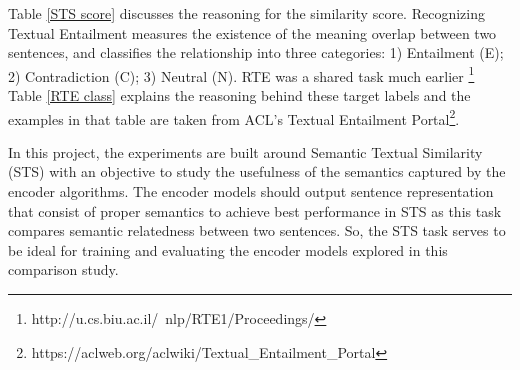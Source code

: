 \documentclass[12pt]{report} %
\begin{document}
    Table \ref{STS score} discusses the reasoning for the similarity score. Recognizing Textual Entailment measures the existence of the meaning overlap between two sentences, and classifies the relationship into three categories: 1) Entailment (E); 2) Contradiction (C); 3) Neutral (N). RTE was a shared task much earlier \citep{dagan2006pascal}\footnote{http://u.cs.biu.ac.il/~nlp/RTE1/Proceedings/}  Table \ref{RTE class} explains the reasoning behind these target labels and the examples in that table are taken from ACL's Textual Entailment Portal\footnote{https://aclweb.org/aclwiki/Textual\_Entailment\_Portal}. 
    
    In this project, the experiments are built around Semantic Textual Similarity (STS) with an objective to study the usefulness of the semantics captured by the encoder algorithms. The encoder models should output sentence representation that consist of proper semantics to achieve best performance in STS as this task compares semantic relatedness between two sentences. So, the STS task serves to be ideal for training and evaluating the encoder models explored in this comparison study.  
    
    \begin{table}[ht] 
    	\centering
    	\caption{Recognizing Textual Entailment (Classification Label)}
    	\label{RTE class} 
    \end{table}    
    
\end{document}
